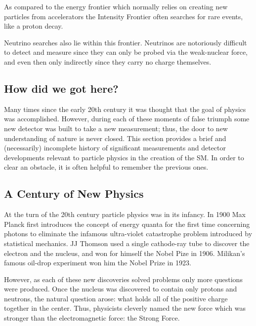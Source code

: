 As compared to the energy frontier which normally relies on creating new particles from accelerators the Intensity Frontier often searches for rare events, like a proton decay.

Neutrino searches also lie within this frontier.
Neutrinos are notoriously difficult to detect and measure since they can only be probed via the weak-nuclear force, and even then only indirectly since they carry no charge themselves.

\subsection{How did we got here?}

Many times since the early 20th century it was thought that the goal of physics was accomplished.
However, during each of these moments of false triumph some new detector was built to take a new measurement; thus, the door to new understanding of nature is never closed.
This section provides a brief and (necessarily) incomplete history of significant measurements and detector developments relevant to particle physics in the creation of the SM.
In order to clear an obstacle, it is often helpful to remember the previous ones.


\subsection{A Century of New Physics}

At the turn of the 20th century particle physics was in its infancy.
In 1900 Max Planck first introduces the concept of energy quanta for the first time concerning photons to eliminate the infamous ultra-violet catastrophe problem introduced by statistical mechanics.
JJ Thomson used a single cathode-ray tube to discover the electron and the nucleus, and won for himself the Nobel Pize in 1906.
Milikan's famous oil-drop experiment won him the Nobel Prize in 1923.

However, as each of these new discoveries solved problems only more questions were produced.
Once the nucleus was discovered to contain only protons and neutrons, the natural question arose: what holds all of the positive charge together in the center.
Thus, physicists cleverly named the new force which was stronger than the electromagnetic force: the Strong Force.

